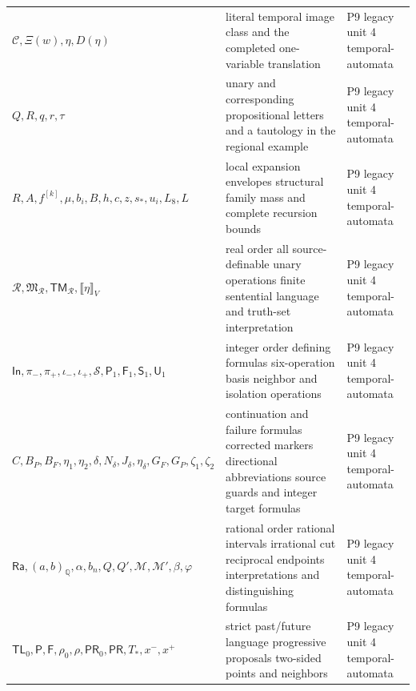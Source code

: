 \begin{longtable}{@{}p{}p{}p{}@{}}
\(\mathcal C,\allowbreak \Xi(w),\allowbreak \eta,\allowbreak D(\eta)\) & literal temporal image class and the completed one-variable translation & P9 legacy unit 4 temporal-\allowbreak{}automata \\
\(Q,\allowbreak R,\allowbreak q,\allowbreak r,\allowbreak \tau\) & unary and corresponding propositional letters and a tautology in the regional example & P9 legacy unit 4 temporal-\allowbreak{}automata \\
\(R,\allowbreak A,\allowbreak f^{[k]},\allowbreak \mu,\allowbreak b_i,\allowbreak B,\allowbreak h,\allowbreak c,\allowbreak z,\allowbreak s_*,\allowbreak u_i,\allowbreak L_8,\allowbreak L\) & local expansion envelopes structural family mass and complete recursion bounds & P9 legacy unit 4 temporal-\allowbreak{}automata \\
\(\mathcal R,\allowbreak \mathfrak M_{\mathcal R},\allowbreak \mathsf{TM}_{\mathcal R},\allowbreak \llbracket\eta\rrbracket_V\) & real order all source-definable unary operations finite sentential language and truth-set interpretation & P9 legacy unit 4 temporal-\allowbreak{}automata \\
\(\mathsf{In},\allowbreak \pi_-,\allowbreak \pi_+,\allowbreak \iota_-,\allowbreak \iota_+,\allowbreak \mathcal S,\allowbreak \mathsf P_1,\allowbreak \mathsf F_1,\allowbreak \mathsf S_1,\allowbreak \mathsf U_1\) & integer order defining formulas six-operation basis neighbor and isolation operations & P9 legacy unit 4 temporal-\allowbreak{}automata \\
\(C,\allowbreak B_P,\allowbreak B_F,\allowbreak \eta_1,\allowbreak \eta_2,\allowbreak \delta,\allowbreak N_\delta,\allowbreak J_\delta,\allowbreak \eta_\delta,\allowbreak G_F,\allowbreak G_P,\allowbreak \zeta_1,\allowbreak \zeta_2\) & continuation and failure formulas corrected markers directional abbreviations source guards and integer target formulas & P9 legacy unit 4 temporal-\allowbreak{}automata \\
\(\mathsf{Ra},\allowbreak (a,\allowbreak b)_{\mathbb Q},\allowbreak \alpha,\allowbreak b_n,\allowbreak Q,\allowbreak Q',\allowbreak \mathcal M,\allowbreak \mathcal M',\allowbreak \beta,\allowbreak \varphi\) & rational order rational intervals irrational cut reciprocal endpoints interpretations and distinguishing formulas & P9 legacy unit 4 temporal-\allowbreak{}automata \\
\(\mathsf{TL}_0,\allowbreak \mathsf P,\allowbreak \mathsf F,\allowbreak \rho_0,\allowbreak \rho,\allowbreak \mathsf{PR}_0,\allowbreak \mathsf{PR},\allowbreak T_*,\allowbreak x^-,\allowbreak x^+\) & strict past/future language progressive proposals two-sided points and neighbors & P9 legacy unit 4 temporal-\allowbreak{}automata \\

\end{longtable}
